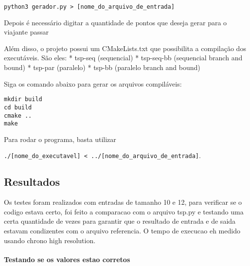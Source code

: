 \documentclass[11pt]{article}
\begin{document}
\texttt{python3\ gerador.py\ \textgreater{}\ {[}nome\_do\_arquivo\_de\_entrada{]}}

Depois é necessário digitar a quantidade de pontos que deseja gerar para
o viajante passar

Além disso, o projeto possui um CMakeLists.txt que possibilita a
compilação dos executáveis. São eles: * tsp-seq (sequencial) *
tsp-seq-bb (sequencial branch and bound) * tsp-par (paralelo) * tsp-bb
(paralelo branch and bound)

Siga os comando abaixo para gerar os arquivos compiláveis:

\begin{verbatim}
mkdir build
cd build
cmake ..
make 
\end{verbatim}

Para rodar o programa, basta utilizar

\texttt{./{[}nome\_do\_executavel{]}\ \textless{}\ ../{[}nome\_do\_arquivo\_de\_entrada{]}}.

    \subsection{Resultados}\label{resultados}

Os testes foram realizados com entradas de tamanho 10 e 12, para
verificar se o codigo estava certo, foi feito a comparacao com o arquivo
tsp.py e testando uma certa quantidade de vezes para garantir que o
resultado de entrada e de saida estavam condizentes com o arquivo
referencia. O tempo de execucao eh medido usando chrono high resolution.

    \paragraph{Testando se os valores estao
corretos}\label{testando-se-os-valores-estao-corretos}
\end{document}

